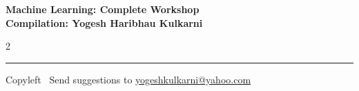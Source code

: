 \documentclass[8pt,landscape]{article}
\begin{document}
\footnotesize


\begin{center}
\Large{\textbf{Machine Learning: Complete Workshop\\ Compilation: Yogesh Haribhau Kulkarni}}
\end{center}

\begin{multicols}{2}

\end{multicols}

\rule{\linewidth}{0.25pt}
\scriptsize
Copyleft \textcopyleft\  Send suggestions to
\href{http://www.yogeshkulkarni.com}{yogeshkulkarni@yahoo.com}
\end{document}
